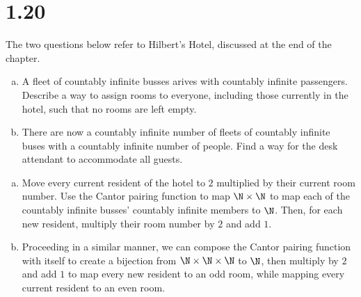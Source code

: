 \documentclass[12pt]{mypackage}
\begin{document}
\section{1.20}%
\begin{problem}
  The two questions below refer to Hilbert's Hotel, discussed at the end of the chapter.
  \begin{enumerate}[(a)]
    \item A fleet of countably infinite busses arives with countably infinite passengers. Describe a way to assign rooms to everyone, including those currently in the hotel, such that no rooms are left empty.
    \item There are now a countably infinite number of fleets of countably infinite buses with a countably infinite number of people. Find a way for the desk attendant to accommodate all guests.
  \end{enumerate}
\end{problem}
\begin{solution}\hfill
  \begin{enumerate}[(a)]
    \item Move every current resident of the hotel to $2$ multiplied by their current room number. Use the Cantor pairing function to map $\N\times \N$ to map each of the countably infinite busses' countably infinite members to $\N$. Then, for each new resident, multiply their room number by $2$ and add $1$.
    \item Proceeding in a similar manner, we can compose the Cantor pairing function with itself to create a bijection from $\N\times\N\times \N$ to $\N$, then multiply by $2$ and add $1$ to map every new resident to an odd room, while mapping every current resident to an even room.
  \end{enumerate}
\end{solution}
\end{document}
